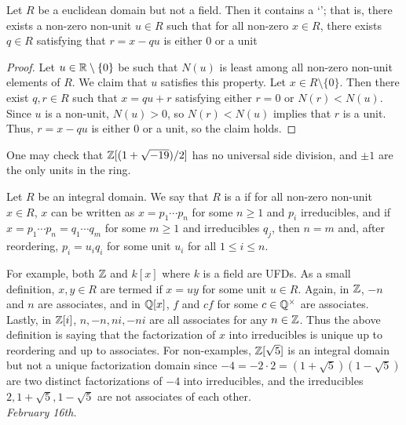 \begin{proposition}
    Let $R$ be a euclidean domain but not a field. Then it contains a `'; that is, there exists a non-zero non-unit $u \in R$ such that for all non-zero $x \in R$, there exists $q \in R$ satisfying that $r=x-qu$ is either $0$ or a unit 
\end{proposition}

\begin{proof}
    Let $u \in \mathbb{R}\setminus\{0\}$ be such that $N(u)$ is least among all non-zero non-unit elements of $R$. We claim that $u$ satisfies this property. Let $x \in R\setminus\{0\}$. Then there exist $q,r \in R$ such that $x = qu+r$ satisfying either $r = 0$ or $N(r) < N(u)$. Since $u$ is a non-unit, $N(u) > 0$, so $N(r) < N(u)$ implies that $r$ is a unit. Thus, $r = x-qu$ is either $0$ or a unit, so the claim holds.
\end{proof}

One may check that $\mathbb{Z}[(1+\sqrt{-19})/2]$ has no universal side division, and $\pm 1$ are the only units in the ring.

\begin{definition}
    Let $R$ be an integral domain. We say that $R$ is a  if for all non-zero non-unit $x \in R$, $x$ can be written as $x = p_{1} \cdots p_{n}$ for some $n \geq 1$ and $p_{i}$ irreducibles, and if $x = p_{1} \cdots p_{n} = q_{1} \cdots q_{m}$ for some $m \geq 1$ and irreducibles $q_{j}$, then $n = m$ and, after reordering, $p_{i} = u_{i} q_{i}$ for some unit $u_{i}$ for all $1 \leq i \leq n$.
\end{definition}

For example, both $\mathbb{Z}$ and $k[x]$ where $k$ is a field are UFDs. As a small definition, $x,y \in R$ are termed  if $x = uy$ for some unit $u \in R$. Again, in $\mathbb{Z}$, $-n$ and $n$ are associates, and in $\mathbb{Q}[x]$, $f$ and $cf$ for some $c \in \mathbb{Q}^{\times}$ are associates. Lastly, in $\mathbb{Z}[i]$, $n,-n, ni, -ni$ are all associates for any $n \in \mathbb{Z}$. Thus the above definition is saying that the factorization of $x$ into irreducibles is unique up to reordering and up to associates. For non-examples, $\mathbb{Z}[\sqrt{5}]$ is an integral domain but not a unique factorization domain since $-4 = -2 \cdot 2 = (1+\sqrt{5})(1-\sqrt{5})$ are two distinct factorizations of $-4$ into irreducibles, and the irreducibles $2, 1+\sqrt{5}, 1-\sqrt{5}$ are not associates of each other.\\ 

\textit{February 16th.}

